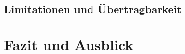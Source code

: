\documentclass[12pt,a4paper]{article}
\begin{document}
\subsection{Limitationen und Übertragbarkeit}

\section{Fazit und Ausblick}

\newpage
\nocite{*}  %
\printbibliography[heading=bibintoc,title={Literaturverzeichnis}]

\newpage
{}
\end{document}
